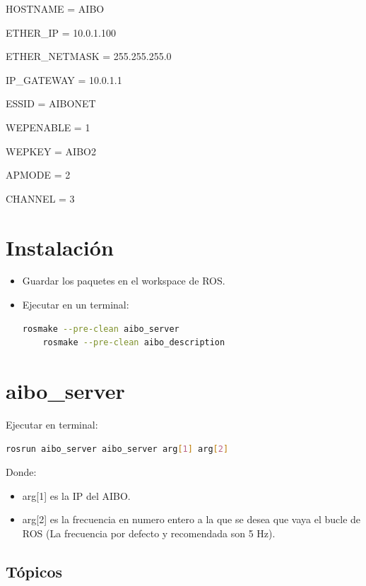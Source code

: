 \documentclass[12pt,a4paper,final,twoside]{book}
\begin{document}
\begin{itemize}
HOSTNAME = AIBO

ETHER{\_}IP = 10.0.1.100

ETHER{\_}NETMASK = 255.255.255.0

IP{\_}GATEWAY = 10.0.1.1

ESSID = AIBONET

WEPENABLE = 1

WEPKEY = AIBO2

APMODE = 2

CHANNEL = 3 
\end{itemize}

\section{Instalación}
\begin{itemize}
\item Guardar los paquetes en el workspace de ROS.
\item Ejecutar en un terminal:
\begin{lstlisting}[language=bash]
	rosmake --pre-clean aibo_server
	rosmake --pre-clean aibo_description
\end{lstlisting}


\end{itemize}
\section{aibo{\_}server}
Ejecutar en terminal:
\begin{lstlisting}[language=bash]
	rosrun aibo_server aibo_server arg[1] arg[2]
\end{lstlisting}



Donde:
\begin{itemize}
\item arg[1] es la IP del AIBO.
\item arg[2] es la frecuencia en numero entero a la que se desea que vaya el bucle de ROS (La frecuencia por defecto y recomendada son 5 Hz).
\end{itemize}


\subsection{Tópicos}
\end{document}
